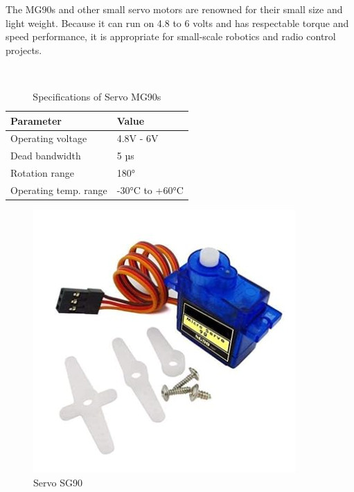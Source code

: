 \documentclass[12pt,a4paper]{report}
\begin{document}
\begin{itemize}
\par The MG90s and other small servo motors are renowned for their small size and light weight. Because it can run on 4.8 to 6 volts and has respectable torque and speed performance, it is appropriate for small-scale robotics and radio control projects.

\begin{table}[H]
\begin{center}
\caption{Specifications of Servo MG90s}%
\hspace*{0.2in}
\\
\begin{tabular}{| p{5cm} | p{5cm} |}
\hline
{\bf{Parameter}}             &{\bf{Value}}           \\ \hline
Operating voltage
& 4.8V - 6V \\ \hline

Dead bandwidth
& 5 µs \\ \hline

Rotation range
& 180° \\ \hline

Operating temp. range
& -30°C to +60°C \\ \hline

\end{tabular}
\end{center}
\end{table}


\begin{figure}[H]
\begin{center}
\includegraphics[scale=0.7]{images/hardware/Servo sg90.png}
\caption{Servo SG90}
\end{center}
\end{figure}


\end{itemize}
\end{document}
